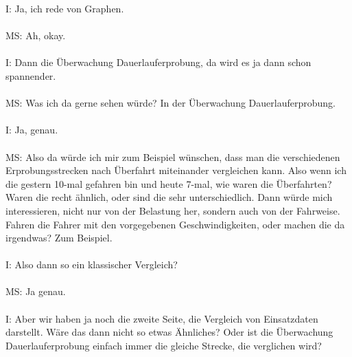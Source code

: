 \begin{linenumbers}
I: Ja, ich rede von Graphen.\\\\
MS: Ah, okay.\\\\
I: Dann die Überwachung Dauerlauferprobung, da wird es ja dann schon spannender.\\\\
MS: Was ich da gerne sehen würde? In der Überwachung Dauerlauferprobung.\\\\
I: Ja, genau.\\\\
MS:  Also da würde ich mir zum Beispiel wünschen, dass man die verschiedenen Erprobungsstrecken nach Überfahrt miteinander vergleichen kann. Also wenn ich die gestern 10-mal gefahren bin und heute 7-mal, wie waren die Überfahrten? Waren die recht ähnlich, oder sind die sehr unterschiedlich. Dann würde mich interessieren, nicht nur von der Belastung her, sondern auch von der Fahrweise. Fahren die Fahrer mit den vorgegebenen Geschwindigkeiten, oder machen die da irgendwas? Zum Beispiel. \\\\
I: Also dann so ein klassischer Vergleich?\\\\
MS: Ja genau.\\\\
I: Aber wir haben ja noch die zweite Seite, die Vergleich von Einsatzdaten darstellt. Wäre das dann nicht so etwas Ähnliches?  Oder ist die Überwachung Dauerlauferprobung einfach immer die gleiche Strecke, die verglichen wird?\\\\

\end{linenumbers}
